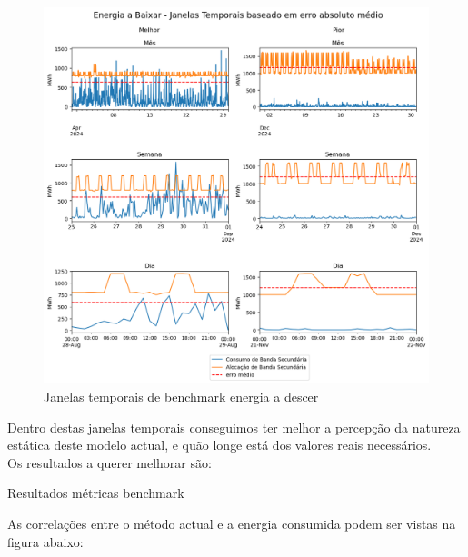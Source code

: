 \begin{figure}[H]
    \centering
    \includegraphics[width=\textwidth]{plots/alocacoes_temporais_downward_dataset.png}
    \caption{Janelas temporais de benchmark energia a descer}
    \label{fig:benchmarktimewindowsdown}
\end{figure}

Dentro destas janelas temporais conseguimos ter melhor a percepção da natureza estática deste modelo actual, e quão longe está dos valores reais necessários.\\

Os resultados a querer melhorar são:\\
\begin{table}[H]
    \caption{Resultados métricas benchmark}    
    \resizebox{\linewidth}{!}{}
    \label{tab:benchmarkmetrics}
    \end{table}

As correlações entre o método actual e a energia consumida podem ser vistas na figura abaixo:\\


